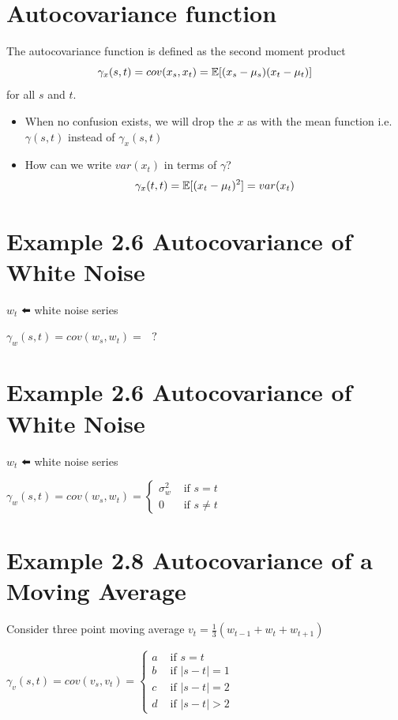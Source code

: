 \documentclass[
  letterpaper,
  DIV=11,
  numbers=noendperiod]{scrreprt}
\providecommand{\tightlist}{%
  \setlength{\itemsep}{0pt}\setlength{\parskip}{0pt}}\usepackage{longtable,booktabs,array}
\begin{document}
\section{Autocovariance function}\label{autocovariance-function}

The autocovariance function is defined as the second moment product \[
\gamma_x(s, t) = cov(x_s, x_t) = {\mathbb{E}}[(x_s - \mu_s)(x_t - \mu_t)]
\] for all \(s\) and \(t\).

\begin{itemize}
\tightlist
\item
  When no confusion exists, we will drop the \(x\) as with the mean
  function i.e.~\(\gamma(s, t)\) instead of \(\gamma_x(s, t)\)
\item
  How can we write \(var(x_t)\) in terms of \(\gamma\)? \[
  \gamma_x(t,t) = {\mathbb{E}}[(x_t - \mu_t)^2] = var(x_t) 
  \]
\end{itemize}

\section{Example 2.6 Autocovariance of White
Noise}\label{example-2.6-autocovariance-of-white-noise}

\(w_t\) ⬅️ white noise series

\(\gamma_w(s, t) = cov(w_s, w_t) = \text{ }?\)

\section{Example 2.6 Autocovariance of White
Noise}\label{example-2.6-autocovariance-of-white-noise-1}

\(w_t\) ⬅️ white noise series

\(\gamma_w(s, t) = cov(w_s, w_t) =  \begin{cases} \sigma^2_w & \text{ if } s = t\\ 0 & \text{ if } s \ne t \end{cases}\)

\section{Example 2.8 Autocovariance of a Moving
Average}\label{example-2.8-autocovariance-of-a-moving-average}

Consider three point moving average
\(v_t = \frac{1}{3}(w_{t-1} + w_t + w_{t+1})\)

\(\gamma_v(s, t) = cov(v_s, v_t) =  \begin{cases}a & \text{ if } s = t\\ b & \text{ if } \vert s-t \vert = 1 \\c& \text{ if } \vert s-t \vert =2 \\ d & \text{ if } \vert s - t\vert > 2\end{cases}\)
\end{document}
